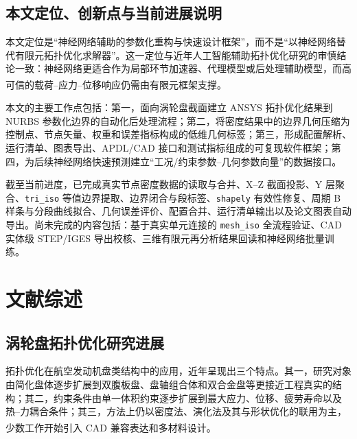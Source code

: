 \documentclass{FRB-style}
\let\oldcite\cite
\renewcommand{\cite}[1]{\textsuperscript{\oldcite{#1}}}
\newcommand{\codepath}[1]{\texttt{#1}}
\begin{document}
\subsection{本文定位、创新点与当前进展说明}

本文定位是“神经网络辅助的参数化重构与快速设计框架”，而不是“以神经网络替代有限元拓扑优化求解器”。这一定位与近年人工智能辅助拓扑优化研究的审慎结论一致：神经网络更适合作为局部环节加速器、代理模型或后处理辅助模型，而高可信的载荷--应力--位移响应仍需由有限元框架支撑\cite{Woldseth2022,Shin2023,Chen2024review,Persia2025}。

本文的主要工作点包括：第一，面向涡轮盘截面建立 ANSYS 拓扑优化结果到 NURBS 参数化边界的自动化后处理流程；第二，将密度结果中的边界几何压缩为控制点、节点矢量、权重和误差指标构成的低维几何标签；第三，形成配置解析、运行清单、图表导出、APDL/CAD 接口和测试指标组成的可复现软件框架；第四，为后续神经网络快速预测建立“工况/约束参数--几何参数向量”的数据接口。

截至当前进度，已完成真实节点密度数据的读取与合并、X--Z 截面投影、Y 层聚合、\codepath{tri\_iso} 等值边界提取、边界闭合与段标签、\codepath{shapely} 有效性修复、周期 B 样条与分段曲线拟合、几何误差评价、配置合并、运行清单输出以及论文图表自动导出。尚未完成的内容包括：基于真实单元连接的 \codepath{mesh\_iso} 全流程验证、CAD 实体级 STEP/IGES 导出校核、三维有限元再分析结果回读和神经网络批量训练。

\section{文献综述}

\subsection{涡轮盘拓扑优化研究进展}

拓扑优化在航空发动机盘类结构中的应用，近年呈现出三个特点。其一，研究对象由简化盘体逐步扩展到双腹板盘、盘轴组合体和双合金盘等更接近工程真实的结构；其二，约束条件由单一体积约束逐步扩展到最大应力、位移、疲劳寿命以及热--力耦合条件；其三，方法上仍以密度法、演化法及其与形状优化的联用为主，少数工作开始引入 CAD 兼容表达和多材料设计\cite{Song2022,Yan2023,Meng2024,Wang2025,Yan2025MM,Meng2023CN}。
\end{document}
